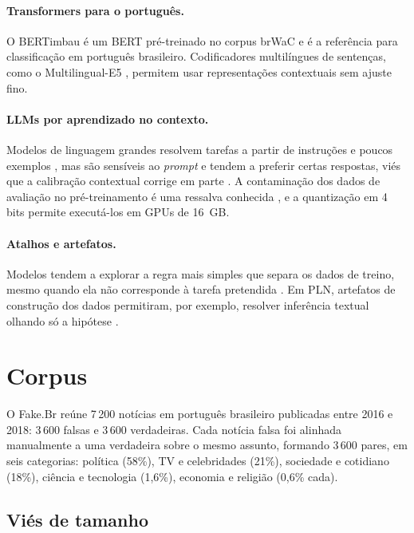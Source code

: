 \paragraph{Transformers para o português.} O BERTimbau \citep{souza2020} é um BERT \citep{devlin2019} pré-treinado no corpus brWaC e é a referência para classificação em português brasileiro. Codificadores multilíngues de sentenças, como o Multilingual-E5 \citep{wang2024e5}, permitem usar representações contextuais sem ajuste fino.

\paragraph{LLMs por aprendizado no contexto.} Modelos de linguagem grandes resolvem tarefas a partir de instruções e poucos exemplos \citep{brown2020}, mas são sensíveis ao \emph{prompt} e tendem a preferir certas respostas, viés que a calibração contextual corrige em parte \citep{zhao2021}. A contaminação dos dados de avaliação no pré-treinamento é uma ressalva conhecida \citep{sainz2023}, e a quantização em 4 bits \citep{dettmers2023} permite executá-los em GPUs de 16~GB.

\paragraph{Atalhos e artefatos.} Modelos tendem a explorar a regra mais simples que separa os dados de treino, mesmo quando ela não corresponde à tarefa pretendida \citep{geirhos2020}. Em PLN, artefatos de construção dos dados permitiram, por exemplo, resolver inferência textual olhando só a hipótese \citep{gururangan2018}.

\section{Corpus}

O Fake.Br \citep{monteiro2018} reúne 7\,200 notícias em português brasileiro publicadas entre 2016 e 2018: 3\,600 falsas e 3\,600 verdadeiras. Cada notícia falsa foi alinhada manualmente a uma verdadeira sobre o mesmo assunto, formando 3\,600 pares, em seis categorias: política (58\%), TV e celebridades (21\%), sociedade e cotidiano (18\%), ciência e tecnologia (1,6\%), economia e religião (0,6\% cada).

\subsection{Viés de tamanho}

